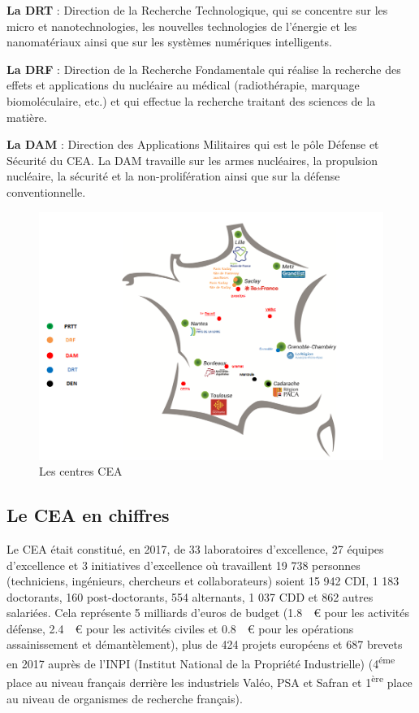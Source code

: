 \textbf{La DRT }: Direction de la Recherche Technologique, qui se concentre sur les micro et nanotechnologies, les nouvelles technologies de l’énergie et les nanomatériaux ainsi que sur les systèmes numériques intelligents.

\textbf{La DRF }: Direction de la Recherche Fondamentale qui réalise la recherche des effets et applications du nucléaire au médical (radiothérapie, marquage biomoléculaire, etc.) et qui effectue la recherche traitant des sciences de la matière.

\textbf{La DAM} : Direction des Applications Militaires qui est le pôle Défense et Sécurité du CEA. La DAM travaille sur les armes nucléaires, la propulsion nucléaire, la sécurité et la non-prolifération ainsi que sur la défense conventionnelle.


\begin{figure}[h]
\centering
\includegraphics[scale=0.7]{fichier_configuration/carte_centres2018.png} 
\caption{Les centres CEA}
\label{centre_CEA}
\end{figure}
\FloatBarrier
\subsection{Le CEA en chiffres}

Le CEA était constitué, en 2017, de 33 laboratoires d'excellence, 27 équipes d’excellence et 3 initiatives d’excellence où travaillent 19 738 personnes (techniciens, ingénieurs, chercheurs et collaborateurs) soient 15 942 CDI, 1 183 doctorants, 160 post-doctorants, 554 alternants, 1 037 CDD et 862 autres salariées. Cela représente 5 milliards d’euros de budget (\SI{1.8}{\giga\euro} pour les activités défense, \SI{2.4}{\giga\euro} pour les activités civiles et \SI{0.8}{\giga\euro} pour les opérations assainissement et démantèlement), plus de 424 projets européens et 687 brevets en 2017 auprès de l’INPI (Institut National de la Propriété Industrielle) (4\textsuperscript{éme} place au niveau français derrière les industriels  Valéo, PSA et Safran et 1\textsuperscript{ère} place au niveau de organismes de recherche français).

